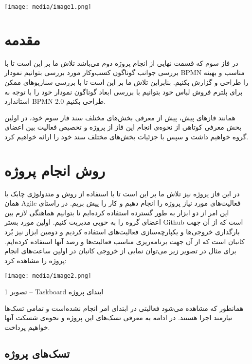 \documentclass[]{article}
\date{}
\begin{document}
\texttt{[image: media/image1.png]}

\section{مقدمه}\label{ux645ux642ux62fux645ux647}

در فاز سوم که قسمت نهایی از انجام پروژه دوم می‌باشد تلاش ما بر این است
تا با بررسی جوانب گوناگون کسب‌وکار مورد بررسی بتوانیم نمودار BPMN مناسب
و بهینه را طراحی و گزارش بکنیم. بنابراین تلاش ما بر این است تا با بررسی
سناریو‌های ممکن برای پلترم فروش لباس خود بتوانیم با بررسی ابعاد گوناگون
نمودار خود را با توجه به استاندارد BPMN 2.0 طراحی بکنیم.

همانند فازهای پیش، پیش از معرفی بخش‌های مختلف سند فاز سوم خود، در اولین
بخش معرفی کوتاهی از نحوه‌ی انجام این فاز از پروژه و تخصیص فعالیت بین
اعضای گروه خواهیم داشت و سپس با جزئیات بخش‌های مختلف سند خود را ارائه
خواهیم کرد.

\section{روش انجام
پروژه}\label{ux631ux648ux634-ux627ux646ux62cux627ux645-ux67eux631ux648ux698ux647}

در این فاز پروژه نیز تلاش ما بر این است تا با استفاده از روش و متدولوژی
چابک یا همان Agile فعالیت‌های مورد نیاز پروژه را انجام دهیم و کار را پیش
بریم. در راستای این امر از دو ابزار به طور گسترده استفاده کرده‌ایم تا
بتوانیم هماهنگی لازم بین اعضای گروه را به خوبی مدیریت کنیم. اولین مورد
بستر Github است که از آن جهت بارگذاری خروجی‌ها و یکپارچه‌سازی فعالیت‌های
استفاده کردیم و دومین ابزار نیز بٌرد کانبان است که از آن جهت برنامه‌ریزی
مناسب فعالیت‌ها و رصد آنها استفاده کرده‌ایم. برای مثال در تصویر زیر
می‌توان نمایی از خروجی کانبان در اولین ساعت‌های انجام پروژه را مشاهده
کرد:

\texttt{[image: media/image2.png]}

تصویر 1 -- Taskboard ابتدای پروژه

همانطور که مشاهده می‌شود فعالیتی در ابتدای امر انجام نشده‌است و تمامی
تسک‌ها نیازمند اجرا هستند. در ادامه به معرفی تسک‌های این پروژه و نحوه‌ی
شسکت‌ آنها خواهیم پرداخت.

\subsection{تسک‌های
پروژه}\label{ux62aux633ux6a9ux647ux627ux6cc-ux67eux631ux648ux698ux647}
\end{document}
